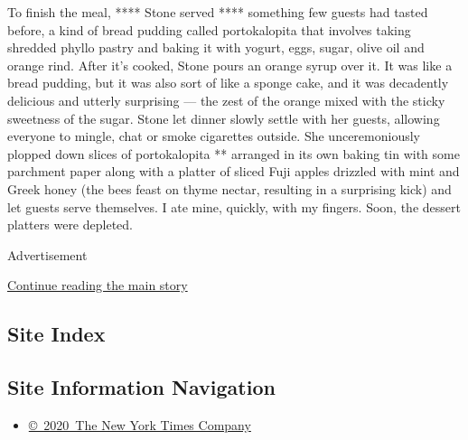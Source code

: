 To finish the meal, **** Stone served **** something few guests had
tasted before, a kind of bread pudding called portokalopita that
involves taking shredded phyllo pastry and baking it with yogurt, eggs,
sugar, olive oil and orange rind. After it's cooked, Stone pours an
orange syrup over it. It was like a bread pudding, but it was also sort
of like a sponge cake, and it was decadently delicious and utterly
surprising --- the zest of the orange mixed with the sticky sweetness of
the sugar. Stone let dinner slowly settle with her guests, allowing
everyone to mingle, chat or smoke cigarettes outside. She
unceremoniously plopped down slices of portokalopita ** arranged in its
own baking tin with some parchment paper along with a platter of sliced
Fuji apples drizzled with mint and Greek honey (the bees feast on thyme
nectar, resulting in a surprising kick) and let guests serve themselves.
I ate mine, quickly, with my fingers. Soon, the dessert platters were
depleted.

Advertisement

\protect\hyperlink{after-bottom}{Continue reading the main story}

\hypertarget{site-index}{%
\subsection{Site Index}\label{site-index}}

\hypertarget{site-information-navigation}{%
\subsection{Site Information
Navigation}\label{site-information-navigation}}

\begin{itemize}
\tightlist
\item
  \href{https://help.nytimes3xbfgragh.onion/hc/en-us/articles/115014792127-Copyright-notice}{©~2020~The
  New York Times Company}
\end{itemize}

